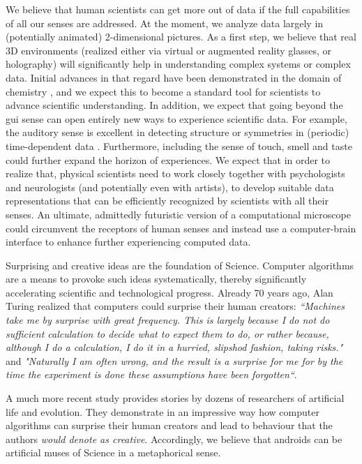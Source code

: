   We believe that human scientists can get more out of data if the full capabilities of all our senses are addressed. At the moment, we analyze data largely in (potentially animated) 2-dimensional pictures. As a first step, we believe that real 3D environments (realized either via virtual or augmented reality glasses, or holography) will significantly help in understanding complex systems or complex data. Initial advances in that regard have been demonstrated in the domain of chemistry \cite{o2018sampling, probst2018exploring, schmid2020structural}, and we expect this to become a standard tool for scientists to advance scientific understanding. In addition, we expect that going beyond the gui sense can open entirely new ways to experience scientific data. For example, the auditory sense is excellent in detecting structure or symmetries in (periodic) time-dependent data \cite{castelvecchi2021sound}. Furthermore, including the sense of touch, smell and taste could further expand the horizon of experiences. We expect that in order to realize that, physical scientists need to work closely together with psychologists and neurologists (and potentially even with artists), to develop suitable data representations that can be efficiently recognized by scientists with all their senses. An ultimate, admittedly futuristic version of a computational microscope could circumvent the receptors of human senses and instead use a computer-brain interface to enhance further experiencing computed data.

Surprising and creative ideas are the foundation of Science. Computer algorithms are a means to provoke such ideas systematically, thereby significantly accelerating scientific and technological progress. Already 70 years ago,  Alan Turing realized that computers could surprise their human creators: \textit{``Machines take me by surprise with great frequency. This is largely because I do not do sufficient calculation to decide what to expect them to do, or rather because, although I do a calculation, I do it in a hurried, slipshod fashion, taking risks."} and \textit{"Naturally I am often wrong, and the result is a surprise for me for by the time the experiment is done these assumptions have been forgotten``}\cite{turing1950computing}.

A much more recent study provides stories by dozens of researchers of artificial life and evolution. They demonstrate in an impressive way how computer algorithms can surprise their human creators and lead to behaviour that the authors \textit{would denote as creative}\cite{lehman2020surprising}. Accordingly, we believe that androids can be artificial muses of Science in a metaphorical sense.


